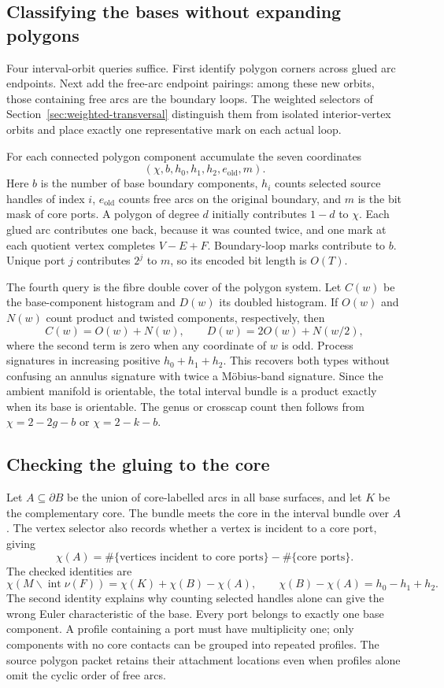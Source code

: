 \subsection{Classifying the bases without expanding polygons}

Four interval-orbit queries suffice. First identify polygon corners across
glued arc endpoints. Next add the free-arc endpoint pairings: among these
new orbits, those containing free arcs are the boundary loops. The weighted
selectors of Section~\ref{sec:weighted-transversal} distinguish them from
isolated interior-vertex orbits and place exactly one representative mark
on each actual loop.

For each connected polygon component accumulate the seven coordinates
\[
 (\chi,b,h_0,h_1,h_2,e_{\mathrm{old}},m).
\]
Here $b$ is the number of base boundary components, $h_i$ counts selected
source handles of index $i$, $e_{\mathrm{old}}$ counts free arcs on the
original boundary, and $m$ is the bit mask of core ports. A polygon of
degree $d$ initially contributes $1-d$ to $\chi$. Each glued arc contributes
one back, because it was counted twice, and one mark at each quotient vertex
completes $V-E+F$. Boundary-loop marks contribute to $b$. Unique port $j$
contributes $2^j$ to $m$, so its encoded bit length is $O(T)$.

The fourth query is the fibre double cover of the polygon system. Let $C(w)$
be the base-component histogram and $D(w)$ its doubled histogram. If $O(w)$
and $N(w)$ count product and twisted components, respectively, then
\[
 C(w)=O(w)+N(w),\qquad D(w)=2O(w)+N(w/2),
\]
where the second term is zero when any coordinate of $w$ is odd. Process
signatures in increasing positive $h_0+h_1+h_2$. This recovers both types
without confusing an annulus signature with twice a M\"obius-band signature.
Since the ambient manifold is orientable, the total interval bundle is a
product exactly when its base is orientable. The genus or crosscap count
then follows from $\chi=2-2g-b$ or $\chi=2-k-b$.

\subsection{Checking the gluing to the core}

Let $A\subseteq\partial B$ be the union of core-labelled arcs in all base
surfaces, and let $K$ be the complementary core. The bundle meets the core
in the interval bundle over $A$. The vertex selector also records whether a
vertex is incident to a core port, giving
\[
 \chi(A)=\#\{\text{vertices incident to core ports}\}-\#\{\text{core ports}\}.
\]
The checked identities are
\[
 \chi(M\mathbin{\backslash}\operatorname{int}\nu(F))
   =\chi(K)+\chi(B)-\chi(A),\qquad
 \chi(B)-\chi(A)=h_0-h_1+h_2.
\]
The second identity explains why counting selected handles alone can give
the wrong Euler characteristic of the base. Every port belongs to exactly
one base component. A profile containing a port must have multiplicity one;
only components with no core contacts can be grouped into repeated profiles.
The source polygon packet retains their attachment locations even when
profiles alone omit the cyclic order of free arcs.

